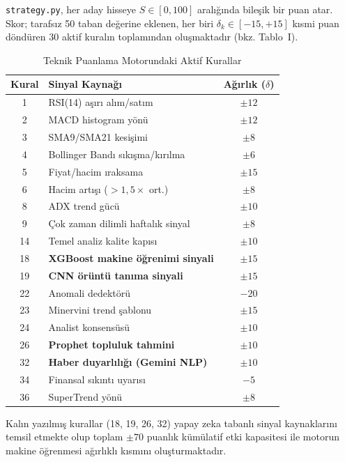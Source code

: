 \documentclass[journal]{IEEEtran}
\begin{document}
\texttt{strategy.py}, her aday hisseye $S \in [0,100]$ aralığında
bileşik bir puan atar. Skor; tarafsız 50 taban değerine eklenen,
her biri $\delta_k \in [-15,+15]$ kısmi puan döndüren 30 aktif
kuralın toplamından oluşmaktadır (bkz. Tablo~I).

\begin{table}[ht]
\caption{Teknik Puanlama Motorundaki Aktif Kurallar}
\label{tab:rules}
\centering
\small
\renewcommand{\arraystretch}{1.1}
\begin{tabular}{clc}
\toprule
\textbf{Kural} & \textbf{Sinyal Kaynağı} & \textbf{Ağırlık ($\delta$)} \\
\midrule
1  & RSI(14) aşırı alım/satım        & $\pm12$ \\
2  & MACD histogram yönü             & $\pm12$ \\
3  & SMA9/SMA21 kesişimi             & $\pm8$  \\
4  & Bollinger Bandı sıkışma/kırılma & $\pm6$  \\
5  & Fiyat/hacim ıraksama            & $\pm15$ \\
6  & Hacim artışı ($>1{,}5\times$ ort.) & $\pm8$ \\
8  & ADX trend gücü                  & $\pm10$ \\
9  & Çok zaman dilimli haftalık sinyal & $\pm8$ \\
14 & Temel analiz kalite kapısı      & $\pm10$ \\
18 & \textbf{XGBoost makine öğrenimi sinyali} & $\pm15$ \\
19 & \textbf{CNN örüntü tanıma sinyali}       & $\pm15$ \\
22 & Anomali dedektörü               & $-20$   \\
23 & Minervini trend şablonu         & $\pm15$ \\
24 & Analist konsensüsü              & $\pm10$ \\
26 & \textbf{Prophet topluluk tahmini} & $\pm10$ \\
32 & \textbf{Haber duyarlılığı (Gemini NLP)} & $\pm10$ \\
34 & Finansal sıkıntı uyarısı        & $-5$    \\
36 & SuperTrend yönü                 & $\pm8$  \\
\bottomrule
\end{tabular}
\end{table}

Kalın yazılmış kurallar (18, 19, 26, 32) yapay zeka tabanlı sinyal
kaynaklarını temsil etmekte olup toplam $\pm70$ puanlık kümülatif etki
kapasitesi ile motorun makine öğrenmesi ağırlıklı kısmını
oluşturmaktadır.
\end{document}
